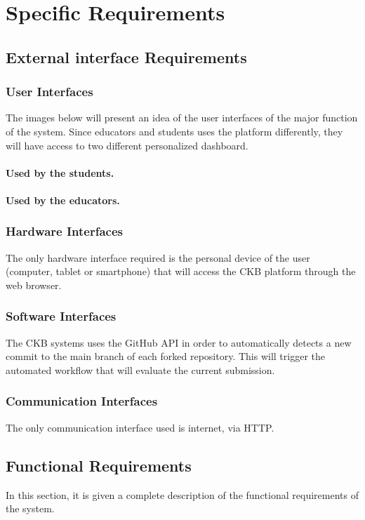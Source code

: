 \chapter{Specific Requirements}

\section{External interface Requirements}
\subsection{User Interfaces}
The images below will present an idea of the user interfaces of the major function of the system. Since educators and students uses the platform differently, they will have access to two different personalized dashboard. 
\subsubsection{Used by the students.}
\subsubsection{Used by the educators.}
\subsection{Hardware Interfaces}
The only hardware interface required is the personal device of the user (computer, tablet or smartphone) that will access the CKB platform through the web browser.
\subsection{Software Interfaces}
The CKB systems uses the GitHub API in order to automatically detects a new commit to the main branch of each forked repository. This will trigger the automated workflow that will evaluate the current submission.
\subsection{Communication Interfaces}
The only communication interface used is internet, via HTTP.
\clearpage

\section{Functional Requirements}
In this section, it is given a complete description of the functional requirements of the system.

